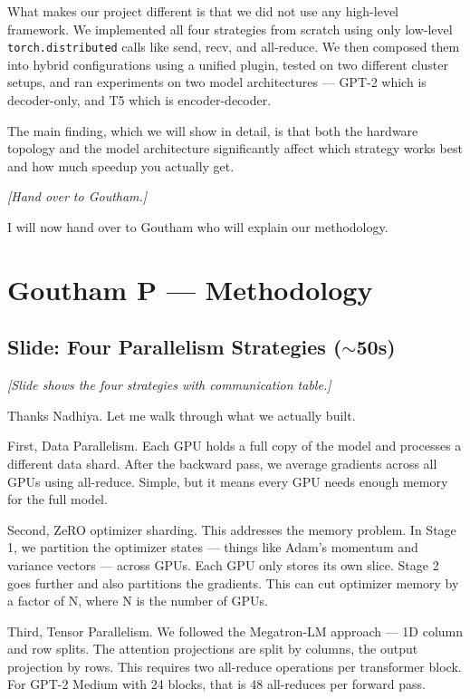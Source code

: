 \documentclass[11pt, a4paper]{article}
\begin{document}
What makes our project different is that we did not use any high-level framework. We implemented all four strategies from scratch using only low-level \texttt{torch.distributed} calls like send, recv, and all-reduce. We then composed them into hybrid configurations using a unified plugin, tested on two different cluster setups, and ran experiments on two model architectures --- GPT-2 which is decoder-only, and T5 which is encoder-decoder.

The main finding, which we will show in detail, is that both the hardware topology and the model architecture significantly affect which strategy works best and how much speedup you actually get.

\textit{[Hand over to Goutham.]}

I will now hand over to Goutham who will explain our methodology.

\section{Goutham P --- Methodology}

\subsection{Slide: Four Parallelism Strategies ($\sim$50s)}
\textit{[Slide shows the four strategies with communication table.]}

Thanks Nadhiya. Let me walk through what we actually built.

First, Data Parallelism. Each GPU holds a full copy of the model and processes a different data shard. After the backward pass, we average gradients across all GPUs using all-reduce. Simple, but it means every GPU needs enough memory for the full model.

Second, ZeRO optimizer sharding. This addresses the memory problem. In Stage 1, we partition the optimizer states --- things like Adam's momentum and variance vectors --- across GPUs. Each GPU only stores its own slice. Stage 2 goes further and also partitions the gradients. This can cut optimizer memory by a factor of N, where N is the number of GPUs.

Third, Tensor Parallelism. We followed the Megatron-LM approach --- 1D column and row splits. The attention projections are split by columns, the output projection by rows. This requires two all-reduce operations per transformer block. For GPT-2 Medium with 24 blocks, that is 48 all-reduces per forward pass.
\end{document}
